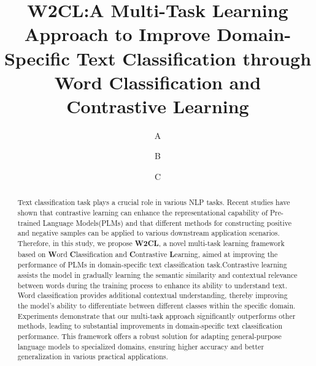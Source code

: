 \documentclass[runningheads]{llncs}
\begin{document}
%
\title{W2CL:A Multi-Task Learning Approach to Improve Domain-Specific Text Classification through Word Classification and Contrastive Learning}
%
%
\author{A \and
B \and
C}
%
%
%
\maketitle              %
%
\begin{abstract}
Text classification task plays a crucial role in various NLP tasks. Recent studies have shown that contrastive learning can enhance the representational capability of Pre-trained Language Models(PLMs) and that different methods for constructing positive and negative samples can be applied to various downstream application scenarios. Therefore, in this study, we propose \textbf{W2CL}, a novel multi-task learning framework based on \textbf{W}ord \textbf{C}lassification and \textbf{C}ontrastive \textbf{L}earning, aimed at improving the performance of PLMs in domain-specific text classification task.Contrastive learning assists the model in gradually learning the semantic similarity and contextual relevance between words during the training process to enhance its ability to understand text. Word classification provides additional contextual understanding, thereby improving the model's ability to differentiate between different classes within the specific domain. Experiments demonstrate that our multi-task approach significantly outperforms other methods, leading to substantial improvements in domain-specific text classification performance. This framework offers a robust solution for adapting general-purpose language models to specialized domains, ensuring higher accuracy and better generalization in various practical applications.

\end{abstract}
%
%
%





%
%
%


\end{document}
